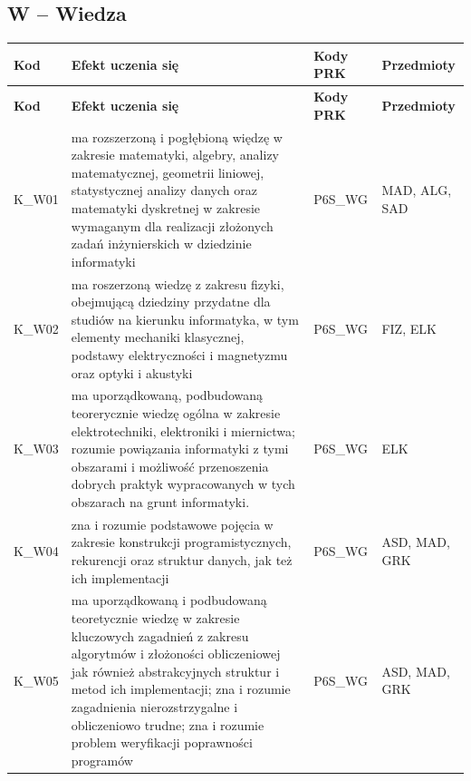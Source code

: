 \documentclass[12pt,a4paper]{article}
\newcommand{\thdrule}{\noalign{\global\setlength{\extrarowheight}{0pt}}}
\newcommand{\thdend}{\noalign{\global\setlength{\extrarowheight}{4pt}}}
\begin{document}
\bigskip
\subsection*{W -- Wiedza}

{\scriptsize
\begin{longtable}{m{1cm}m{8.8cm}m{2.1cm}m{2.5cm}}
\thdrule\toprule
\rowcolor{pjatkRed} {\color{white}\footnotesize\textbf{\vphantom{Ag}Kod}} & {\color{white}\footnotesize\textbf{\vphantom{Ag}Efekt uczenia się}} & {\color{white}\footnotesize\textbf{\vphantom{Ag}Kody PRK}} & {\color{white}\footnotesize\textbf{\vphantom{Ag}Przedmioty}} \\
\midrule\thdend
\endfirsthead
\thdrule\toprule
\rowcolor{pjatkRed} {\color{white}\footnotesize\textbf{\vphantom{Ag}Kod}} & {\color{white}\footnotesize\textbf{\vphantom{Ag}Efekt uczenia się}} & {\color{white}\footnotesize\textbf{\vphantom{Ag}Kody PRK}} & {\color{white}\footnotesize\textbf{\vphantom{Ag}Przedmioty}} \\
\midrule\thdend
\endhead
\rowcolor{tableRowLight} K\_W01 & ma rozszerzoną i pogłębioną więdzę w zakresie matematyki, algebry, analizy matematycznej, geometrii liniowej, statystycznej analizy danych oraz matematyki dyskretnej w zakresie wymaganym dla realizacji złożonych zadań inżynierskich w dziedzinie informatyki & {\scriptsize P6S\_WG} & {\scriptsize MAD, ALG, SAD} \\
\rowcolor{tableRowAlt} K\_W02 & ma roszerzoną wiedzę z zakresu fizyki, obejmującą dziedziny przydatne dla studiów na kierunku informatyka, w tym elementy mechaniki klasycznej, podstawy elektryczności i magnetyzmu oraz optyki i akustyki & {\scriptsize P6S\_WG} & {\scriptsize FIZ, ELK} \\
\rowcolor{tableRowLight} K\_W03 & ma uporządkowaną, podbudowaną teorerycznie wiedzę ogólna w zakresie elektrotechniki, elektroniki i miernictwa; rozumie powiązania informatyki z tymi obszarami i możliwość przenoszenia dobrych praktyk wypracowanych w tych obszarach na grunt informatyki. & {\scriptsize P6S\_WG} & {\scriptsize ELK} \\
\rowcolor{tableRowAlt} K\_W04 & zna i rozumie podstawowe pojęcia w zakresie konstrukcji programistycznych, rekurencji oraz struktur danych, jak też ich implementacji & {\scriptsize P6S\_WG} & {\scriptsize ASD, MAD, GRK} \\
\rowcolor{tableRowLight} K\_W05 & ma uporządkowaną i podbudowaną teoretycznie wiedzę w zakresie kluczowych zagadnień z zakresu algorytmów i złożoności obliczeniowej jak również abstrakcyjnych struktur i metod ich implementacji; zna i rozumie zagadnienia nierozstrzygalne i obliczeniowo trudne; zna i rozumie problem weryfikacji poprawności programów & {\scriptsize P6S\_WG} & {\scriptsize ASD, MAD, GRK} \\

\end{longtable}}
\end{document}
